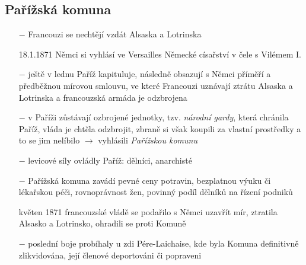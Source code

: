 \documentclass{article}
\begin{document}
\subsection*{Pařížská komuna}
\begin{itemize}
    \vspace{-0.5em}
    \setlength\itemsep{0.15em}
    \item[$-$] Francouzi se nechtějí vzdát Alsaska a Lotrinska
    \item[18.1.1871] Němci si vyhlásí ve Versailles Německé císařství v čele s Vilémem I.
    \item[$-$] ještě v lednu Paříž kapituluje, následně obsazují s Němci příměří a předběžnou mírovou smlouvu, ve které Francouzi uznávají ztrátu Alsaska a Lotrinska a francouzská armáda je odzbrojena
    \item[$-$] v Paříži zůstávají ozbrojené jednotky, tzv. \textit{národní gardy}, která chránila Paříž, vláda je chtěla odzbrojit, zbraně si však koupili za vlastní prostředky a to se jim nelíbilo $\rightarrow$ vyhlásili \textit{Pařížskou komunu}
    \item[$-$] levicové síly ovládly Paříž: dělníci, anarchisté
    \item[$-$] Pařížská komuna zavádí pevné ceny potravin, bezplatnou výuku či lékařskou péči, rovnoprávnost žen, povinný podíl dělníků na řízení podniků
    \item[květen 1871] francouzské vládě se podařilo s Němci uzavřít mír, ztratila Alsasko a Lotrinsko, ohradili se proti Komuně
    \item[$-$] poslední boje probíhaly u zdi Pére-Laichaise, kde byla Komuna definitivně zlikvidována, její členové deportováni či popraveni
\end{itemize}
\end{document}
